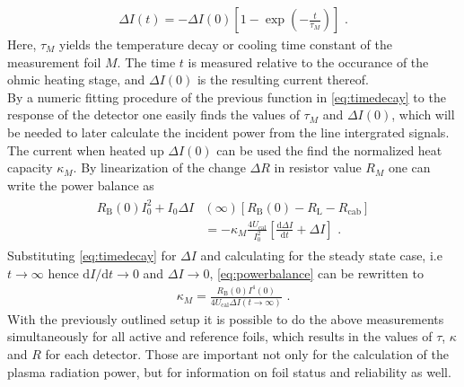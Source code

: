 \documentclass[
    aps,%
    twocolumn,%
    secnumarabic,%
    amssymb,%
    prd,%
    10pt%
    ]{revtex4-1}
\newcommand{\diff}{\text{d}}
\newcommand{\ix}[1]{_\text{#1}}
\begin{document}
    \begin{align}
        \Delta I\left(t\right) = - \Delta I\left(0\right)%
            \left[1-\exp\left(-\frac{t}{\tau_{M}}\right)\right]\,\,.%
            \label{eq:timedecay}
    \end{align}
    Here, $\tau_{M}$ yields the temperature decay or cooling time constant of the measurement foil $M$. The time $t$ is measured relative to the occurance of the ohmic heating stage, and \mbox{$\Delta I\left(0\right)$} is the resulting current thereof.\\%
    By a numeric fitting procedure of the previous function in \cref{eq:timedecay} to the response of the detector one easily finds the values of $\tau_{M}$ and \mbox{$\Delta I\left(0\right)$}, which will be needed to later calculate the incident power from the line intergrated signals.\\%
    The current when heated up \mbox{$\Delta I\left(0\right)$} can be used the find the normalized heat capacity $\kappa_{M}$. By linearization of the change $\Delta R$ in resistor value $R_{M}$ one can write the power balance as%
    \begin{align}
        \begin{split}\label{eq:powerbalance}
            R\ix{B}\left(0\right)I^{2}_{0}+I_{0}\Delta%
                I&\left(\infty\right)\left[R\ix{B}\left(0\right)-%
                R\ix{L}-R\ix{cab}\right]\\%
            &=-\kappa_{M}\frac{4U\ix{cal}}{I^{2}_{0}}\left[%
                \frac{\diff\Delta I}{\diff t}+\Delta I\right]\,\,.%
        \end{split}
    \end{align}
    Substituting \cref{eq:timedecay} for $\Delta I$ and calculating for the steady state case, i.e \mbox{$t\rightarrow\infty$} hence \mbox{$\diff I/\diff t\rightarrow 0$} and \mbox{$\Delta I\rightarrow 0$,} \cref{eq:powerbalance} can be rewritten to
    \begin{align}
        \kappa_{M}=\frac{R\ix{B}\left(0\right)I^{4}\left(0\right)}%
                        {4U\ix{cal}\Delta I%
                         \left(t\rightarrow\infty\right)}\,\,.%
    \end{align}
    With the previously outlined setup it is possible to do the above measurements simultaneously for all active and reference foils, which results in the values of $\tau$, $\kappa$ and $R$ for each detector. Those are important not only for the calculation of the plasma radiation power, but for information on foil status and reliability as well.\\%
\end{document}
